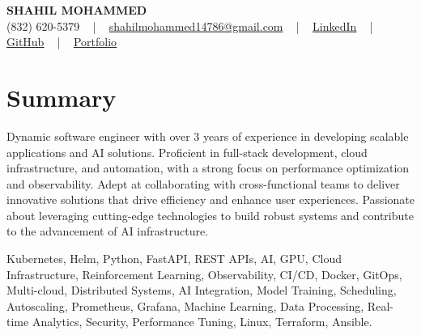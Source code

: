 \documentclass[letterpaper,10pt]{article}
\begin{document}
\begin{center}
    {\fontsize{14pt}{12pt}\selectfont \textbf{\MakeUppercase{Shahil Mohammed}}}\\ \vspace{2pt}
    \fontsize{10pt}{12pt}\selectfont (832) 620-5379 ~ | ~ \href{mailto:shahilmohammed14786@gmail.com}{shahilmohammed14786@gmail.com} ~ | ~  
    \href{https://www.linkedin.com/in/shahil-mohammed-9652931a1/}{\color{blue}\underline{LinkedIn}}  ~ | ~ 
    \href{https://github.com/freakbeast14}{\color{blue}\underline{GitHub}} ~ | ~ 
    \href{https://shahil-mohammed.netlify.app/}{\color{blue}\underline{Portfolio}}
    \vspace{-8pt}
\end{center}

\section{Summary}
\vspace{-2pt}\fontsize{8pt}{9pt}\selectfont
Dynamic software engineer with over 3 years of experience in developing scalable applications and AI solutions. Proficient in full-stack development, cloud infrastructure, and automation, with a strong focus on performance optimization and observability. Adept at collaborating with cross-functional teams to deliver innovative solutions that drive efficiency and enhance user experiences. Passionate about leveraging cutting-edge technologies to build robust systems and contribute to the advancement of AI infrastructure.
 \vspace{-5pt}
 
{\fontsize{1pt}{1pt}\selectfont\color{white}
Kubernetes, Helm, Python, FastAPI, REST APIs, AI, GPU, Cloud Infrastructure, Reinforcement Learning, Observability, CI/CD, Docker, GitOps, Multi-cloud, Distributed Systems, AI Integration, Model Training, Scheduling, Autoscaling, Prometheus, Grafana, Machine Learning, Data Processing, Real-time Analytics, Security, Performance Tuning, Linux, Terraform, Ansible.
}
\vspace{-8pt}

\vspace{-2pt}
\end{document}
